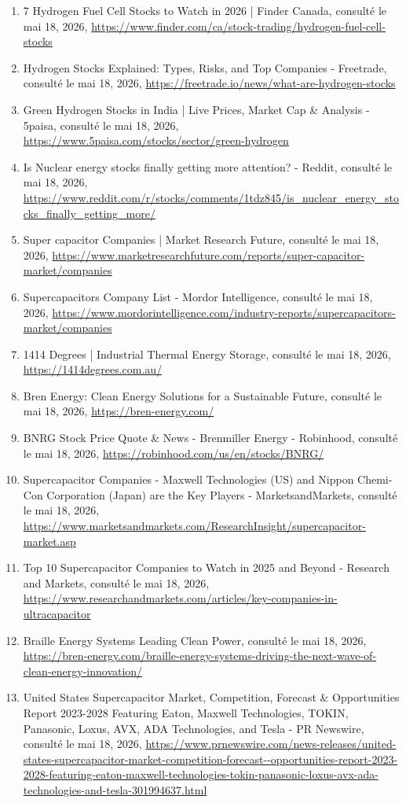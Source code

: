 \documentclass[11pt,a4paper]{article}
\begin{document}
\begin{enumerate}
    \item 7 Hydrogen Fuel Cell Stocks to Watch in 2026 | Finder Canada, consulté le mai 18, 2026, \url{https://www.finder.com/ca/stock-trading/hydrogen-fuel-cell-stocks}
    \item Hydrogen Stocks Explained: Types, Risks, and Top Companies - Freetrade, consulté le mai 18, 2026, \url{https://freetrade.io/news/what-are-hydrogen-stocks}
    \item Green Hydrogen Stocks in India | Live Prices, Market Cap \& Analysis - 5paisa, consulté le mai 18, 2026, \url{https://www.5paisa.com/stocks/sector/green-hydrogen}
    \item Is Nuclear energy stocks finally getting more attention? - Reddit, consulté le mai 18, 2026, \url{https://www.reddit.com/r/stocks/comments/1tdz845/is_nuclear_energy_stocks_finally_getting_more/}
    \item Super capacitor Companies | Market Research Future, consulté le mai 18, 2026, \url{https://www.marketresearchfuture.com/reports/super-capacitor-market/companies}
    \item Supercapacitors Company List - Mordor Intelligence, consulté le mai 18, 2026, \url{https://www.mordorintelligence.com/industry-reports/supercapacitors-market/companies}
    \item 1414 Degrees | Industrial Thermal Energy Storage, consulté le mai 18, 2026, \url{https://1414degrees.com.au/}
    \item Bren Energy: Clean Energy Solutions for a Sustainable Future, consulté le mai 18, 2026, \url{https://bren-energy.com/}
    \item BNRG Stock Price Quote \& News - Brenmiller Energy - Robinhood, consulté le mai 18, 2026, \url{https://robinhood.com/us/en/stocks/BNRG/}
    \item Supercapacitor Companies - Maxwell Technologies (US) and Nippon Chemi-Con Corporation (Japan) are the Key Players - MarketsandMarkets, consulté le mai 18, 2026, \url{https://www.marketsandmarkets.com/ResearchInsight/supercapacitor-market.asp}
    \item Top 10 Supercapacitor Companies to Watch in 2025 and Beyond - Research and Markets, consulté le mai 18, 2026, \url{https://www.researchandmarkets.com/articles/key-companies-in-ultracapacitor}
    \item Braille Energy Systems Leading Clean Power, consulté le mai 18, 2026, \url{https://bren-energy.com/braille-energy-systems-driving-the-next-wave-of-clean-energy-innovation/}
    \item United States Supercapacitor Market, Competition, Forecast \& Opportunities Report 2023-2028 Featuring Eaton, Maxwell Technologies, TOKIN, Panasonic, Loxus, AVX, ADA Technologies, and Tesla - PR Newswire, consulté le mai 18, 2026, \url{https://www.prnewswire.com/news-releases/united-states-supercapacitor-market-competition-forecast--opportunities-report-2023-2028-featuring-eaton-maxwell-technologies-tokin-panasonic-loxus-avx-ada-technologies-and-tesla-301994637.html}
\end{enumerate}
\end{document}
